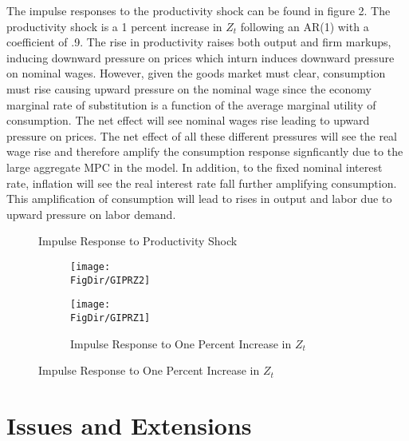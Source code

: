 \documentclass[titlepage]{\econtex}\providecommand{\texname}{BufferStockTheory}
\providecommand{\FigDir}{Figures}
\begin{document}
The impulse responses to the productivity shock can be found in figure 2. The productivity shock is a 1 percent increase in $Z_{t}$ following an AR(1) with a coefficient of .9. The rise in productivity raises both output and firm markups, inducing downward pressure on prices which inturn induces downward pressure on nominal wages. However, given the goods market must clear, consumption must rise causing upward pressure on the nominal wage since the economy marginal rate of substitution is a function of the average marginal utility of consumption. The net effect will see nominal wages rise leading to upward pressure on prices. The net effect of all these different pressures will see the real wage rise and therefore amplify the consumption response signficantly due to the large aggregate MPC in the model. In addition, to the fixed nominal interest rate, inflation will see the real interest rate fall further amplifying consumption. This amplification of consumption will lead to rises in output and labor due to upward pressure on labor demand.

\begin{figure}{Impulse Response to Productivity Shock}
  \begin{subfigure}{}
    \centering\texttt{[image: \\FigDir/GIPRZ2]}
  \end{subfigure}
  \begin{subfigure}{}
    \centering\texttt{[image: \\FigDir/GIPRZ1]}
    \caption{ Impulse Response to One Percent Increase in $Z_{t}$}
  \end{subfigure}
\end{figure}



\hypertarget{Issues and Extensions}{}
\section{Issues and Extensions}
\end{document}
